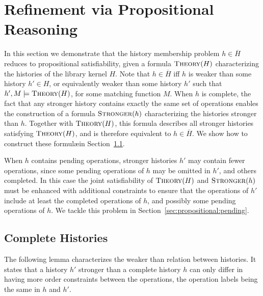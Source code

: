 
\section{Refinement via Propositional Reasoning}
\label{sec:propositional}

In this section we demonstrate that the history membership problem $h \in
\overline{H}$ reduces to propositional satisfiability, given a formula
$\textsc{Theory}(H)$ characterizing the histories of the library kernel $H$.
Note that $h \in \overline{H}$ if{f} $h$ is weaker than some history $h' \in
H$, or equivalently weaker than some history $h'$ such that
$h',M |= \textsc{Theory}(H)$, for some matching function $M$. When
$h$ is complete, the fact that any stronger history contains exactly the same
set of operations enables the construction of a formula $\textsc{Stronger}(h)$
characterizing the histories stronger than $h$. Together with
$\textsc{Theory}(H)$, this formula describes all stronger histories satisfying
$\textsc{Theory}(H)$, and is therefore equivalent to $h \in \overline{H}$. We show how
to construct these formul\ae in Section~\ref{sec:propositional:complete}.

When $h$ contains pending operations, stronger histories $h'$ may contain fewer
operations, since some pending operations of $h$ may be omitted in $h'$, and
others completed. In this case the joint satisfiability of $\textsc{Theory}(H)$
and $\textsc{Stronger}(h)$ must be enhanced with additional constraints to
ensure that the operations of $h'$ include at least the completed operations of
$h$, and possibly some pending operations of $h$. We tackle this problem in
Section~\ref{sec:propositional:pending}.

\subsection{Complete Histories}
\label{sec:propositional:complete}

The following lemma characterizes the weaker than relation between
histories. It states that a history $h'$ stronger than a complete history $h$
can only differ in having more order constraints between the operations, the
operation labels being the same in $h$ and $h'$.

%
%

